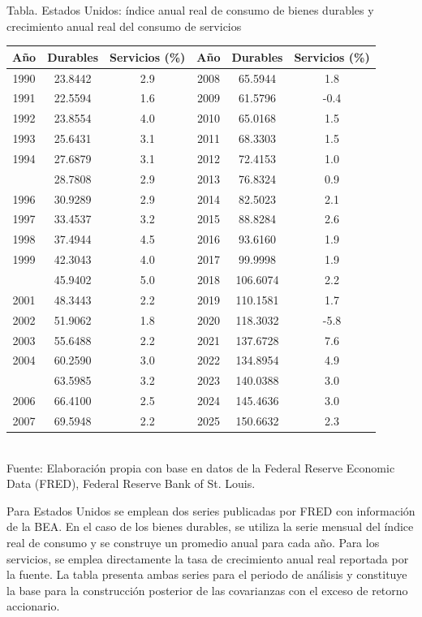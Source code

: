 \documentclass{article}\usepackage[]{graphicx}\usepackage[]{xcolor}
\begin{document}
\begin{center}
Tabla. Estados Unidos: índice anual real de consumo de bienes durables y crecimiento anual real del consumo de servicios
\end{center}
\begin{center}

\begin{tabular}{cccccc}
\toprule
Año & Durables & Servicios (\%) & Año & Durables & Servicios (\%)\\
\midrule
1990 & 23.8442 & 2.9 & 2008 & 65.5944 & 1.8\\
1991 & 22.5594 & 1.6 & 2009 & 61.5796 & -0.4\\
1992 & 23.8554 & 4.0 & 2010 & 65.0168 & 1.5\\
1993 & 25.6431 & 3.1 & 2011 & 68.3303 & 1.5\\
1994 & 27.6879 & 3.1 & 2012 & 72.4153 & 1.0\\
\addlinespace
1995 & 28.7808 & 2.9 & 2013 & 76.8324 & 0.9\\
1996 & 30.9289 & 2.9 & 2014 & 82.5023 & 2.1\\
1997 & 33.4537 & 3.2 & 2015 & 88.8284 & 2.6\\
1998 & 37.4944 & 4.5 & 2016 & 93.6160 & 1.9\\
1999 & 42.3043 & 4.0 & 2017 & 99.9998 & 1.9\\
\addlinespace
2000 & 45.9402 & 5.0 & 2018 & 106.6074 & 2.2\\
2001 & 48.3443 & 2.2 & 2019 & 110.1581 & 1.7\\
2002 & 51.9062 & 1.8 & 2020 & 118.3032 & -5.8\\
2003 & 55.6488 & 2.2 & 2021 & 137.6728 & 7.6\\
2004 & 60.2590 & 3.0 & 2022 & 134.8954 & 4.9\\
\addlinespace
2005 & 63.5985 & 3.2 & 2023 & 140.0388 & 3.0\\
2006 & 66.4100 & 2.5 & 2024 & 145.4636 & 3.0\\
2007 & 69.5948 & 2.2 & 2025 & 150.6632 & 2.3\\
\bottomrule
\end{tabular}
\\[0.3em]
{\footnotesize Fuente: Elaboración propia con base en datos de la Federal Reserve Economic Data (FRED), Federal Reserve Bank of St. Louis.}
\end{center}


Para Estados Unidos se emplean dos series publicadas por FRED con información de la BEA. En el caso de los bienes durables, se utiliza la serie mensual del índice real de consumo y se construye un promedio anual para cada año. Para los servicios, se emplea directamente la tasa de crecimiento anual real reportada por la fuente. La tabla presenta ambas series para el periodo de análisis y constituye la base para la construcción posterior de las covarianzas con el exceso de retorno accionario.
\end{document}
